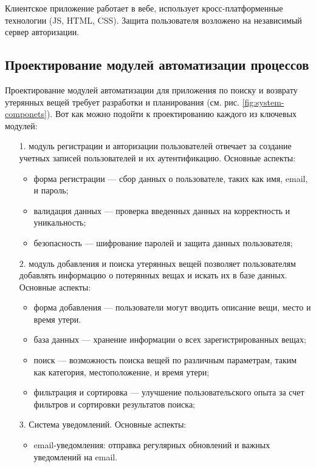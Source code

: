 Клиентское приложение работает в вебе, использует кросс-платформенные технологии (JS, HTML, CSS). Защита пользователя возложено на независимый сервер авторизации.

\subsection{Проектирование модулей автоматизации процессов}

Проектирование модулей автоматизации для приложения по поиску и возврату утерянных вещей требует разработки и планирования (см. рис. \ref{fig:system-componets}). Вот как можно подойти к проектированию каждого из ключевых модулей:

\begin{enumerate}[wide=0pt]
	\item[1.] модуль регистрации и авторизации пользователей отвечает за создание учетных записей пользователей и их аутентификацию. Основные аспекты:
	
	\begin{itemize}[wide=0pt]
		\item форма регистрации --- сбор данных о пользователе, таких как имя, email, и пароль;
		\item валидация данных --- проверка введенных данных на корректность и уникальность;
		\item безопасность --- шифрование паролей и защита данных пользователя;
	\end{itemize}

	\item[2.] модуль добавления и поиска утерянных вещей позволяет пользователям добавлять информацию о потерянных вещах и искать их в базе данных. Основные аспекты:
	
	\begin{itemize}[wide=0pt]
		\item форма добавления --- пользователи могут вводить описание вещи, место и время утери.
		\item база данных --- хранение информации о всех зарегистрированных вещах;
		\item поиск --- возможность поиска вещей по различным параметрам, таким как категория, местоположение, и время утери;
		\item фильтрация и сортировка --- улучшение пользовательского опыта за счет фильтров и сортировки результатов поиска;
	\end{itemize}

	\item[3.] Система уведомлений. Основные аспекты:
	
	\begin{itemize}[wide=0pt]
		\item email-уведомления: отправка регулярных обновлений и важных уведомлений на email.
	\end{itemize}
\end{enumerate}

